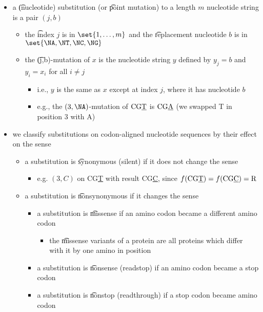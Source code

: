   \begin{itemize}
\item a \t{(nucleotide) substitution} (or \t{point mutation}) to a
  length $m$ nucleotide string is a pair $(j,b)$
  \begin{itemize}
  \item the \t{index} $j$ is in $\set{1, \dots, m}$ and the
      \t{replacement} nucleotide $b$ is in
      $\set{\NA, \NT, \NC, \NG}$
  \item the \t{(j,b)-mutation} of $x$ is the nucleotide string
      $y$ defined by $y_j = b$ and $y_i = x_i$ for all
      $i \neq j$
      \begin{itemize}
    \item i.e., $y$ is the same as $x$ except at index $j$,
              where it has nucleotide $b$
    \item e.g., the $(3, \NA)$-mutation of $\text{CG\underline{T}}$
              is $\text{CG\underline{A}}$ (we swapped T in position 3
              with A)
      \end{itemize}
  \end{itemize}
\item we classify substitutions on codon-aligned nucleotide
  sequences by their effect on the sense
  \begin{itemize}
  \item a substitution is \t{synonymous (silent)} if it does not
      change the sense
      \begin{itemize}
    \item e.g. $(3, C)$ on CG\underline{T} with result
              CG\underline{C}, since
              $
                f(\text{CG\underline{T}}) =
                f(\text{CG\underline{C}}) =
                \text{R}
              $
      \end{itemize}
  \item a substitution is \t{nonsynonymous} if it changes the
      sense
      \begin{itemize}
    \item a substitution is \t{missense} if an amino codon became
              a different amino codon
              \begin{itemize}
          \item the \t{missense variants} of a protein are all
                                  proteins which differ with it by one amino in
                                  position
              \end{itemize}
    \item a substitution is \t{nonsense (readstop)} if an amino
              codon became a stop codon
    \item a substitution is \t{nonstop (readthrough)} if a stop
              codon became amino codon
      \end{itemize}
  \end{itemize}
  \end{itemize}